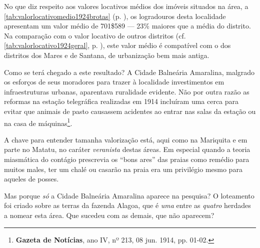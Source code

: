 
No que diz respeito aos valores locativos médios dos imóveis situados na área, a \autoref{tab:valorlocativomedio1924brotas} (p. \pageref{tab:valorlocativomedio1924brotas}), os logradouros desta localidade apresentam um valor médio de 701\$589 --- 23\% maiores que a média do distrito. Na comparação com o valor locativo de outros distritos (cf. \autoref{tab:valorlocativo1924geral}, p. \pageref{tab:valorlocativo1924geral}), este valor médio é compatível com o dos distritos dos Mares e de Santana, de urbanização bem mais antiga.


Como se terá chegado a este resultado? A Cidade Balneária Amaralina, malgrado os esforços de seus moradores para trazer à localidade investimentos em infraestruturas urbanas, aparentava ruralidade evidente. Não por outra razão as reformas na estação telegráfica realizadas em 1914 incluíram uma cerca para evitar que animais de pasto causassem acidentes ao entrar nas salas da estação ou na casa de máquinas\footnote{\textbf{Gazeta de Notícias}, ano IV, nº 213, 08 jun. 1914, pp. 01-02.}.

A chave para entender tamanha valorização está, aqui como na Mariquita e em parte no Matatu, no caráter \textit{veranista} destas áreas. Em especial quando a teoria miasmática do contágio prescrevia os ``bons ares'' das praias como remédio para muitos males, ter um chalé ou casarão na praia era um privilégio mesmo para aqueles de posses.








Mas porque \textit{só} a Cidade Balneária Amaralina aparece na pesquisa? O loteamento foi criado sobre as terras da fazenda Alagoa, que é \textit{uma} entre as \textit{quatro} herdades a nomear esta área. Que sucedeu com as demais, que não aparecem?

